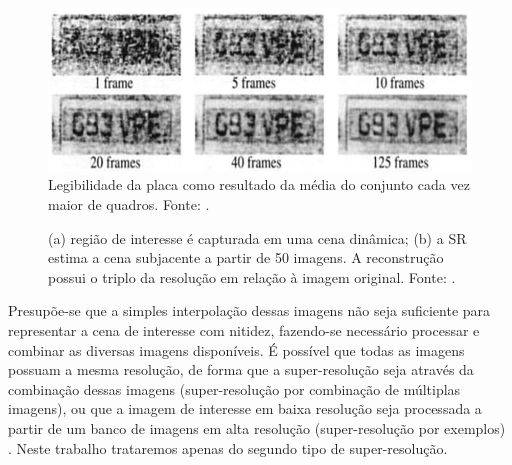 \begin{figure}[h]
	\centering
	\includegraphics[scale=0.45]{figuras/SR_img_2.png}
	\caption{Legibilidade da placa como resultado da média do conjunto cada vez maior de quadros. Fonte: \cite{kang2000digital}.} 
	\label{fig:SR_2}
\end{figure}

\begin{figure}[h]
    \centering
    \qquad
    \caption{(a)  região de interesse é capturada em uma cena dinâmica; (b) a SR estima a cena subjacente a partir de 50 imagens. A reconstrução possui o triplo da resolução em relação à imagem original. Fonte: \cite{kang2000digital}. }%
	    \label{fig:SR_3}
\end{figure}

    Presupõe-se que a simples interpolação dessas imagens não seja suficiente para representar a cena de interesse com nitidez, fazendo-se necessário processar e combinar as diversas imagens disponíveis. É possível que todas as imagens possuam a mesma resolução, de forma que a super-resolução seja através da combinação dessas imagens (super-resolução por combinação de múltiplas imagens), ou que a imagem de interesse em baixa resolução seja processada a partir de um banco de imagens em alta resolução (super-resolução por exemplos) \cite{garcia2013tecnicas}. Neste trabalho trataremos apenas do segundo tipo de super-resolução.



